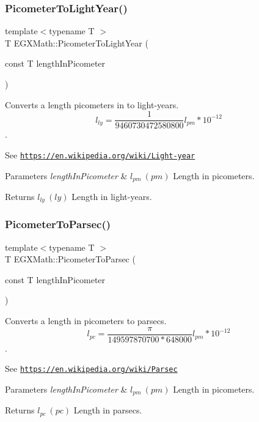 \subsubsection{\texorpdfstring{Picometer\+To\+Light\+Year()}{PicometerToLightYear()}}
{\footnotesize\ttfamily template$<$typename T $>$ \\
T E\+G\+X\+Math\+::\+Picometer\+To\+Light\+Year (\begin{DoxyParamCaption}\item[{const T}]{length\+In\+Picometer }\end{DoxyParamCaption})}



Converts a length picometers in to light-\/years. \[ l_{ly}= \frac{1}{9460730472580800} l_{pm} * 10^{-12} \]. 

See \href{https://en.wikipedia.org/wiki/Light-year}{\tt https\+://en.\+wikipedia.\+org/wiki/\+Light-\/year} 
\begin{DoxyParams}{Parameters}
{\em length\+In\+Picometer} & $ l_{pm}\ (pm)$ Length in picometers. \\
\hline
\end{DoxyParams}
\begin{DoxyReturn}{Returns}
$ l_{ly}\ (ly)$ Length in light-\/years. 
\end{DoxyReturn}
\mbox{\label{group___e_g_x_math-_conversions-_length_conversions-_picometer-_astronomical_ga3248f6de04d23f6568866a8cd80188b6}} 
\subsubsection{\texorpdfstring{Picometer\+To\+Parsec()}{PicometerToParsec()}}
{\footnotesize\ttfamily template$<$typename T $>$ \\
T E\+G\+X\+Math\+::\+Picometer\+To\+Parsec (\begin{DoxyParamCaption}\item[{const T}]{length\+In\+Picometer }\end{DoxyParamCaption})}



Converts a length in picometers to parsecs. \[ l_{pc}=\frac{\pi}{149597870700 * 648000} l_{pm} * 10^{-12} \]. 

See \href{https://en.wikipedia.org/wiki/Parsec}{\tt https\+://en.\+wikipedia.\+org/wiki/\+Parsec} 
\begin{DoxyParams}{Parameters}
{\em length\+In\+Picometer} & $ l_{pm}\ (pm)$ Length in picometers. \\
\hline
\end{DoxyParams}
\begin{DoxyReturn}{Returns}
$ l_{pc}\ (pc)$ Length in parsecs. 
\end{DoxyReturn}
